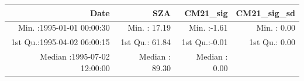 \documentclass[
  10pt,
  a4paper,oneside]{article}
\begin{document}
\begin{longtable}[]{@{}rrrr@{}}
\toprule
\begin{minipage}[b]{0.34\columnwidth}\raggedleft
Date\strut
\end{minipage} & \begin{minipage}[b]{0.19\columnwidth}\raggedleft
SZA\strut
\end{minipage} & \begin{minipage}[b]{0.18\columnwidth}\raggedleft
CM21\_sig\strut
\end{minipage} & \begin{minipage}[b]{0.18\columnwidth}\raggedleft
CM21\_sig\_sd\strut
\end{minipage}\tabularnewline
\midrule
\endhead
\begin{minipage}[t]{0.34\columnwidth}\raggedleft
Min. :1995-01-01 00:00:30\strut
\end{minipage} & \begin{minipage}[t]{0.19\columnwidth}\raggedleft
Min. : 17.19\strut
\end{minipage} & \begin{minipage}[t]{0.18\columnwidth}\raggedleft
Min. :-1.61\strut
\end{minipage} & \begin{minipage}[t]{0.18\columnwidth}\raggedleft
Min. : 0.00\strut
\end{minipage}\tabularnewline
\begin{minipage}[t]{0.34\columnwidth}\raggedleft
1st Qu.:1995-04-02 06:00:15\strut
\end{minipage} & \begin{minipage}[t]{0.19\columnwidth}\raggedleft
1st Qu.: 61.84\strut
\end{minipage} & \begin{minipage}[t]{0.18\columnwidth}\raggedleft
1st Qu.:-0.01\strut
\end{minipage} & \begin{minipage}[t]{0.18\columnwidth}\raggedleft
1st Qu.: 0.00\strut
\end{minipage}\tabularnewline
\begin{minipage}[t]{0.34\columnwidth}\raggedleft
Median :1995-07-02 12:00:00\strut
\end{minipage} & \begin{minipage}[t]{0.19\columnwidth}\raggedleft
Median : 89.30\strut
\end{minipage} & \begin{minipage}[t]{0.18\columnwidth}\raggedleft
Median : 0.00\strut
\end{minipage} & \begin{minipage}[t]{0.18\columnwidth}\raggedleft

\end{minipage}
\end{longtable}
\end{document}
